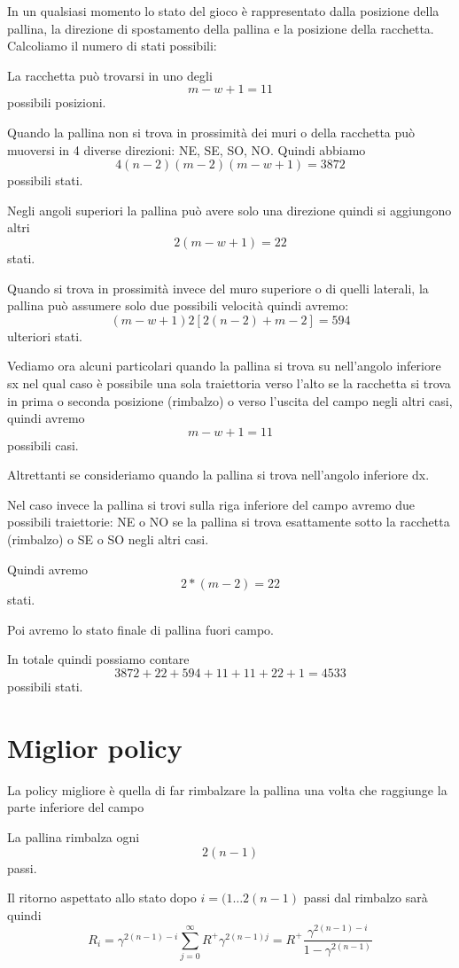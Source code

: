 \documentclass[a4paper,11pt]{article}
\begin{document}
In un qualsiasi momento lo stato del gioco è rappresentato dalla posizione
della pallina, la direzione di spostamento della pallina e la posizione della racchetta.
Calcoliamo il numero di stati possibili:

La racchetta può trovarsi in uno degli
\[m - w + 1 = 11 \] possibili posizioni.

Quando la pallina non si trova in prossimità dei muri o della racchetta
può muoversi in 4 diverse direzioni: NE, SE, SO, NO.
Quindi abbiamo
\[ 4 (n-2)(m-2) (m - w + 1) = 3872 \]
possibili stati.

Negli angoli superiori la pallina può avere solo una direzione quindi
si aggiungono altri 
\[
	2 (m -w +1) = 22
\] stati.

Quando si trova in prossimità invece del muro superiore o di quelli laterali, la pallina può assumere solo due possibili velocità quindi avremo:
\[ (m -w + 1) 2 [ 2 (n - 2) + m - 2] = 594 \]
ulteriori stati.

Vediamo ora alcuni particolari quando la pallina si trova su nell'angolo
inferiore sx nel qual caso è possibile una sola traiettoria verso l'alto
se la racchetta si trova in prima o seconda posizione (rimbalzo) o verso 
l'uscita del campo negli altri casi, quindi avremo
\[ m-w+1 = 11 \] possibili casi.

Altrettanti se consideriamo quando la pallina si trova nell'angolo inferiore dx.

Nel caso invece la pallina si trovi sulla riga inferiore del campo avremo due possibili traiettorie: NE o  NO se la pallina si trova esattamente sotto la racchetta (rimbalzo) o SE o SO negli altri casi.

Quindi avremo
\[ 2 * (m - 2) = 22 \] stati.

Poi avremo lo stato finale di pallina fuori campo.

In totale quindi possiamo contare
\[
	3872 + 22 + 594 + 11 + 11 + 22 + 1 = 4533
\] possibili stati.


\section{Miglior policy}

La policy migliore è quella di far rimbalzare la pallina una volta che raggiunge la parte inferiore del campo

La pallina rimbalza ogni
\[
	2 (n - 1)
\]
passi.

Il ritorno aspettato allo stato dopo $ i = (1 \dots 2(n-1) $ passi dal rimbalzo sarà quindi
\[
	R_i = \gamma ^ {2(n-1)-i} \sum_{j=0}^{\infty} R^+ \gamma ^ {2(n-1)j} =
	 R^+ \frac{ \gamma ^ {2(n-1)-i}}{1-\gamma ^ {2(n-1)}}
\]
\end{document}

